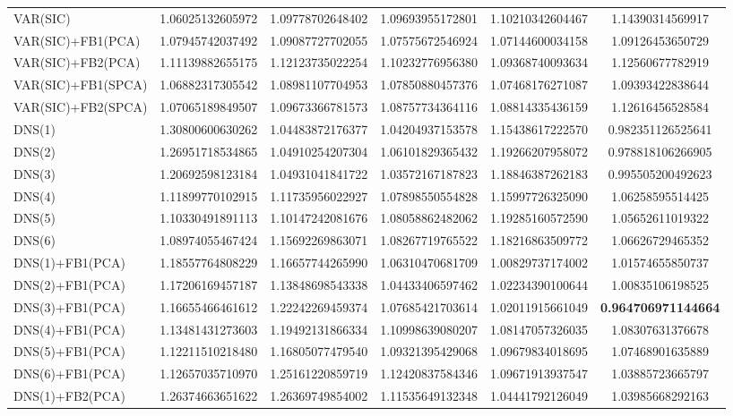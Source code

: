 \begin{table}[htb]
\begin{adjustbox}{totalheight=\baselineskip}
\begin{tabular}{lSSSSS}
VAR(SIC) & 1.06025132605972 & 1.09778702648402 & 1.09693955172801 & 1.10210342604467 & 1.14390314569917 \\ 
VAR(SIC)+FB1(PCA) & 1.07945742037492 & 1.09087727702055 & 1.07575672546924 & 1.07144600034158 & 1.09126453650729 \\ 
VAR(SIC)+FB2(PCA) & 1.11139882655175 & 1.12123735022254 & 1.10232776956380 & 1.09368740093634 & 1.12560677782919 \\ 
VAR(SIC)+FB1(SPCA) & 1.06882317305542 & 1.08981107704953 & 1.07850880457376 & 1.07468176271087 & 1.09393422838644 \\ 
VAR(SIC)+FB2(SPCA) & 1.07065189849507 & 1.09673366781573 & 1.08757734364116 & 1.08814335436159 & 1.12616456528584 \\ 
DNS(1) & 1.30800600630262 & 1.04483872176377 & 1.04204937153578 & 1.15438617222570 & 0.982351126525641 \\ 
DNS(2) & 1.26951718534865 & 1.04910254207304 & 1.06101829365432 & 1.19266207958072 & 0.978818106266905 \\ 
DNS(3) & 1.20692598123184 & 1.04931041841722 & 1.03572167187823 & 1.18846387262183 & 0.995505200492623 \\ 
DNS(4) & 1.11899770102915 & 1.11735956022927 & 1.07898550554828 & 1.15997726325090 & 1.06258595514425 \\ 
DNS(5) & 1.10330491891113 & 1.10147242081676 & 1.08058862482062 & 1.19285160572590 & 1.05652611019322 \\ 
DNS(6) & 1.08974055467424 & 1.15692269863071 & 1.08267719765522 & 1.18216863509772 & 1.06626729465352 \\ 
DNS(1)+FB1(PCA) & 1.18557764808229 & 1.16657744265990 & 1.06310470681709 & 1.00829737174002 & 1.01574655850737 \\ 
DNS(2)+FB1(PCA) & 1.17206169457187 & 1.13848698543338 & 1.04433406597462 & 1.02234390100644 & 1.00835106198525 \\ 
DNS(3)+FB1(PCA) & 1.16655466461612 & 1.22242269459374 & 1.07685421703614 & 1.02011915661049 & \bfseries 0.964706971144664 \\ 
DNS(4)+FB1(PCA) & 1.13481431273603 & 1.19492131866334 & 1.10998639080207 & 1.08147057326035 & 1.08307631376678 \\ 
DNS(5)+FB1(PCA) & 1.12211510218480 & 1.16805077479540 & 1.09321395429068 & 1.09679834018695 & 1.07468901635889 \\ 
DNS(6)+FB1(PCA) & 1.12657035710970 & 1.25161220859719 & 1.12420837584346 & 1.09671913937547 & 1.03885723665797 \\ 
DNS(1)+FB2(PCA) & 1.26374663651622 & 1.26369749854002 & 1.11535649132348 & 1.04441792126049 & 1.03985668292163 \\ 

\end{tabular}
\end{adjustbox}
\end{table}
